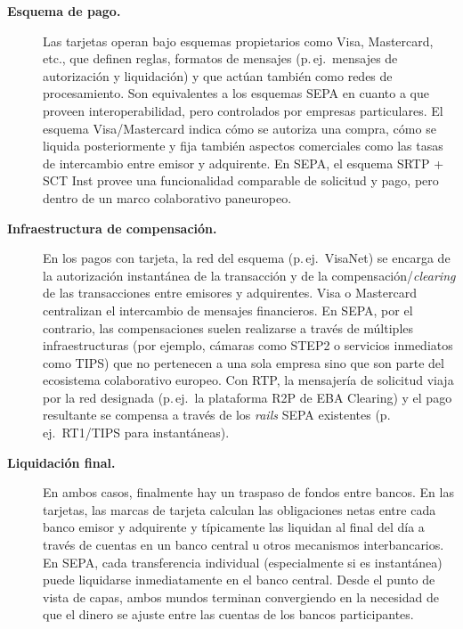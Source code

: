 \begin{description}
  \item[\textbf{Esquema de pago.}]
    Las tarjetas operan bajo esquemas propietarios como Visa, Mastercard, etc., que definen reglas, formatos de mensajes (p.\,ej.\ mensajes de autorización y liquidación) y que actúan también como redes de procesamiento. Son equivalentes a los esquemas SEPA en cuanto a que proveen interoperabilidad, pero controlados por empresas particulares. El esquema Visa/Mastercard indica cómo se autoriza una compra, cómo se liquida posteriormente y fija también aspectos comerciales como las tasas de intercambio entre emisor y adquirente. En SEPA, el esquema SRTP + SCT Inst provee una funcionalidad comparable de solicitud y pago, pero dentro de un marco colaborativo paneuropeo.
  \item[\textbf{Infraestructura de compensación.}]
    En los pagos con tarjeta, la red del esquema (p.\,ej.\ VisaNet) se encarga de la autorización instantánea de la transacción y de la compensación/\textit{clearing} de las transacciones entre emisores y adquirentes. Visa o Mastercard centralizan el intercambio de mensajes financieros. En SEPA, por el contrario, las compensaciones suelen realizarse a través de múltiples infraestructuras (por ejemplo, cámaras como STEP2 o servicios inmediatos como TIPS) que no pertenecen a una sola empresa sino que son parte del ecosistema colaborativo europeo. Con RTP, la mensajería de solicitud viaja por la red designada (p.\,ej.\ la plataforma R2P de EBA Clearing) y el pago resultante se compensa a través de los \emph{rails} SEPA existentes (p.\,ej.\ RT1/TIPS para instantáneas).

  \item[\textbf{Liquidación final.}]
    En ambos casos, finalmente hay un traspaso de fondos entre bancos. En las tarjetas, las marcas de tarjeta calculan las obligaciones netas entre cada banco emisor y adquirente y típicamente las liquidan al final del día a través de cuentas en un banco central u otros mecanismos interbancarios. En SEPA, cada transferencia individual (especialmente si es instantánea) puede liquidarse inmediatamente en el banco central. Desde el punto de vista de capas, ambos mundos terminan convergiendo en la necesidad de que el dinero se ajuste entre las cuentas de los bancos participantes.
\end{description}

